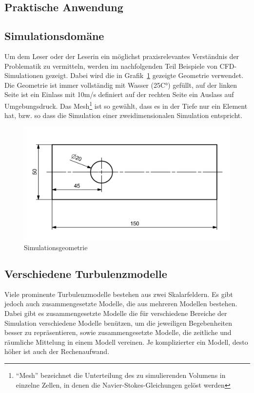 \begin{refsection}



\section{Praktische Anwendung}

\subsection{Simulationsdomäne}
\label{subsubsec:domain-desc}

Um dem Leser oder der Leserin ein möglichst praxisrelevantes Verständnis der Problematik zu vermitteln, werden
im nachfolgenden Teil Beispiele von CFD-Simulationen gezeigt.
Dabei wird die in Grafik~\ref{fig:SimDomain} gezeigte Geometrie verwendet.
Die Geometrie ist immer vollständig mit Wasser (25C°) gefüllt,
auf der linken Seite ist ein Einlass mit 10m/s definiert auf der rechten Seite ein Auslass auf Umgebungsdruck.
Das Mesh\footnote{``Mesh'' bezeichnet die Unterteilung des zu simulierenden Volumens in einzelne Zellen,
in denen die Navier-Stokes-Gleichungen gelöst werden} ist so gewählt, dass es in der Tiefe nur ein Element hat,
bzw. so dass die Simulation einer zweidimensionalen Simulation entspricht.

\begin{figure}
    \includegraphics[width=\textwidth]{papers/reynolds/images/domain.png}
    \caption{Simulationsgeometrie}
    \label{fig:SimDomain}
\end{figure}

\subsection{Verschiedene Turbulenzmodelle}

Viele prominente Turbulenzmodelle bestehen aus zwei Skalarfeldern.
Es gibt jedoch auch zusammengesetzte Modelle, die aus mehreren Modellen bestehen.
Dabei gibt es zusammengesetzte Modelle die für verschiedene Bereiche der Simulation verschiedene Modelle benützen,
um die jeweiligen Begebenheiten besser zu repräsentieren,
sowie zusammengesetzte Modelle, die zeitliche und räumliche Mittelung in einem Modell vereinen.
Je komplizierter ein Modell, desto höher ist auch der Rechenaufwand.


\end{refsection}
